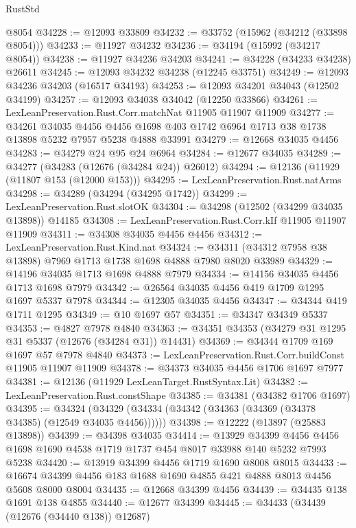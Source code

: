 \begin{lexlean}{RustStd}
\begin{coremodule}
    @8054
@34228 := @12093 @33809
@34232 := @33752 (@15962 (@34212 (@33898 @8054)))
@34233 := @11927 @34232
@34236 := @34194 (@15992 (@34217 @8054))
@34238 := @11927 @34236 @34203
@34241 := @34228 (@34233 @34238) @26611
@34245 := @12093 @34232 @34238 (@12245 @33751)
@34249 := @12093 @34236 @34203 (@16517 @34193)
@34253 := @12093 @34201 @34043 (@12502 @34199)
@34257 := @12093 @34038 @34042 (@12250 @33866)
@34261 := LexLeanPreservation.Rust.Corr.matchNat @11905 @11907 @11909
@34277 := @34261
    @34035
    @4456
    @4456
    @1698
    @403
    @1742
    @6964
    @1713
    @38
    @1738
    @13898
    @5232
    @7957
    @5238
    @4888
    @33991
@34279 := @12668 @34035 @4456
@34283 := @34279 @24 @95 @24 @6964
@34284 := @12677 @34035
@34289 := @34277 (@34283 (@12676 (@34284 @24)) @26012)
@34294 := @12136 (@11929 (@11807 @153 (@12000 @153)))
@34295 := LexLeanPreservation.Rust.natArms
@34298 := @34289 (@34294 (@34295 @1742))
@34299 := LexLeanPreservation.Rust.slotOK
@34304 := @34298 (@12502 (@34299 @34035 @13898)) @14185
@34308 := LexLeanPreservation.Rust.Corr.kIf @11905 @11907 @11909
@34311 := @34308 @34035 @4456 @4456
@34312 := LexLeanPreservation.Rust.Kind.nat
@34324 := @34311 (@34312 @7958 @38 @13898) @7969 @1713 @1738 @1698 @4888 @7980 @8020 @33989
@34329 := @14196 @34035 @1713 @1698 @4888 @7979
@34334 := @14156 @34035 @4456 @1713 @1698 @7979
@34342 := @26564 @34035 @4456 @419 @1709 @1295 @1697 @5337 @7978
@34344 := @12305 @34035 @4456
@34347 := @34344 @419 @1711 @1295
@34349 := @10 @1697 @57
@34351 := @34347 @34349 @5337
@34353 := @4827 @7978 @4840
@34363 := @34351 @34353 (@34279 @31 @1295 @31 @5337 (@12676 (@34284 @31)) @14431)
@34369 := @34344 @1709 @169 @1697 @57 @7978 @4840
@34373 := LexLeanPreservation.Rust.Corr.buildConst @11905 @11907 @11909
@34378 := @34373 @34035 @4456 @1706 @1697 @7977
@34381 := @12136 (@11929 LexLeanTarget.RustSyntax.Lit)
@34382 := LexLeanPreservation.Rust.constShape
@34385 := @34381 (@34382 @1706 @1697)
@34395 := @34324 (@34329 (@34334 (@34342 (@34363 (@34369 (@34378 @34385) (@12549 @34035 @4456))))))
@34398 := @12222 (@13897 (@25883 @13898))
@34399 := @34398 @34035
@34414 := @13929
    @34399
    @4456
    @4456
    @1698
    @1690
    @4538
    @1719
    @1737
    @454
    @8017
    @33988
    @140
    @5232
    @7993
    @5238
@34420 := @13919 @34399 @4456 @1719 @1690 @8008 @8015
@34433 := @16674 @34399 @4456 @183 @1688 @1690 @4855 @421 @4888 @8013 @4456 @5608 @8000 @8004
@34435 := @12668 @34399 @4456
@34439 := @34435 @138 @1691 @138 @4855
@34440 := @12677 @34399
@34445 := @34433 (@34439 (@12676 (@34440 @138)) @12687)

\end{coremodule}
\end{lexlean}
